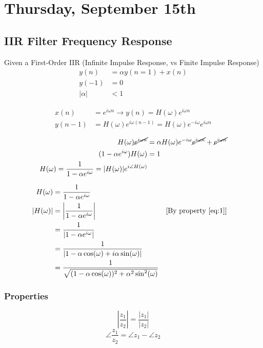 \section{Thursday, September 15th}
\subsection{IIR Filter Frequency Response}
Given a First-Order IIR (Infinite Impulse Response, vs Finite Impulse Response)
\begin{align*}
    y(n)
    &=
    \alpha y(n=1)+x(n)
    \\
    y(-1)
    &=
    0
    \\
    |\alpha|
    &<
    1
\end{align*}

\begin{align*}
    x(n)
    &=
    e^{i\omega n} \to y(n)=H(\omega)e^{i\omega n}
    \\
    y(n-1)
    &=
    H(\omega)e^{i\omega (n-1)} = H(\omega)e^{-i\omega}e^{i\omega n}
\end{align*}

\begin{align*}
    H(\omega)\cancel{e^{i\omega n}} 
    &= \alpha H(\omega)e^{-i\omega}\cancel{e^{i\omega n}}+\cancel{e^{i\omega n}}
    \\
    (1-\alpha e^{i\omega})H(\omega) 
    &= 1
    \\
    H(\omega) 
    = \frac1{1-\alpha e^{i\omega}} 
    = |H(\omega)|e^{i\angle H(\omega)}
\end{align*}

\begin{align*}
    H(\omega) 
    &= \frac1{1-\alpha e^{i\omega}}
    \\
    |H(\omega)| 
    &= \left|\frac1{1-\alpha e^{i\omega}}\right|
    &&\text{[By property \eqref{eq:1}]}
    \\
    &= \frac1{|1-\alpha e^{i\omega}|}
    \\
    &= \frac1{|1-\alpha\cos(\omega)+i\alpha\sin(\omega)|}
    \\
    &= \frac1{\sqrt{(1-\alpha\cos(\omega))^2+\alpha^2\sin^2(\omega)}}
\end{align*}

\subsubsection{Properties}
\begin{equation}\label{eq:1}
    \left|\frac{z_1}{z_2}\right| = \frac{|z_1|}{|z_2|}
\end{equation}
\[
    \angle \frac{z_1}{z_2} = \angle z_1 - \angle z_2
\]

